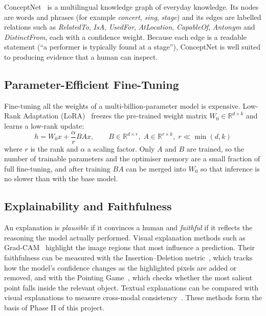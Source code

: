ConceptNet~\cite{speer2017conceptnet} is a multilingual knowledge graph of everyday knowledge. Its nodes are words and phrases (for example \emph{concert}, \emph{sing}, \emph{stage}) and its edges are labelled relations such as \emph{RelatedTo}, \emph{IsA}, \emph{UsedFor}, \emph{AtLocation}, \emph{CapableOf}, \emph{Antonym} and \emph{DistinctFrom}, each with a confidence weight. Because each edge is a readable statement (``a performer is typically found at a stage''), ConceptNet is well suited to producing evidence that a human can inspect.

\subsection{Parameter-Efficient Fine-Tuning}

Fine-tuning all the weights of a multi-billion-parameter model is expensive. Low-Rank Adaptation (LoRA)~\cite{hu2022lora} freezes the pre-trained weight matrix $W_0 \in \mathbb{R}^{d \times k}$ and learns a low-rank update:
\begin{equation}
  h = W_0 x + \frac{\alpha}{r} B A x, \qquad
  B \in \mathbb{R}^{d \times r},\; A \in \mathbb{R}^{r \times k},\; r \ll \min(d,k)
  \label{eq:lora}
\end{equation}
where $r$ is the rank and $\alpha$ a scaling factor. Only $A$ and $B$ are trained, so the number of trainable parameters and the optimiser memory are a small fraction of full fine-tuning, and after training $BA$ can be merged into $W_0$ so that inference is no slower than with the base model.

\subsection{Explainability and Faithfulness}

An explanation is \emph{plausible} if it convinces a human and \emph{faithful} if it reflects the reasoning the model actually performed. Visual explanation methods such as Grad-CAM~\cite{selvaraju2017gradcam} highlight the image regions that most influence a prediction. Their faithfulness can be measured with the Insertion--Deletion metric~\cite{petsiuk2018rise}, which tracks how the model's confidence changes as the highlighted pixels are added or removed, and with the Pointing Game~\cite{zhang2018excitation}, which checks whether the most salient point falls inside the relevant object. Textual explanations can be compared with visual explanations to measure cross-modal consistency~\cite{zhang2024crossmodal,parcalabescu2025faithfulness}. These methods form the basis of Phase II of this project.

